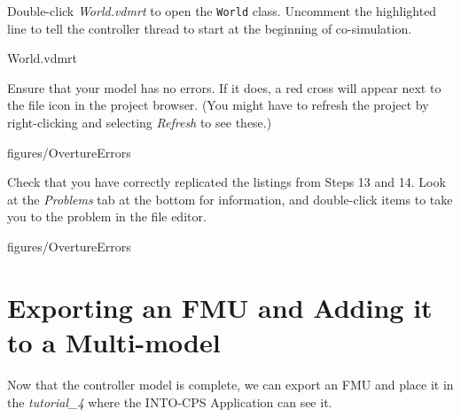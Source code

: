 \documentclass[11pt,a4paper]{../tutorial}
\begin{document}
\begin{instructions}
\item \label{step:world} Double-click \emph{World.vdmrt} to open the \texttt{World} class. Uncomment the highlighted line to tell the controller thread to start at the beginning of co-simulation.

    \bigskip
    
    {World.vdmrt}

\item Ensure that your model has no errors. If it does, a red cross will appear next to the file icon in the project browser. (You might have to refresh the project by right-clicking and selecting \emph{Refresh} to see these.)

    \begin{annotation}[width=0.25\linewidth,trim=0 340 535 60,clip]{figures/OvertureErrors}
    \end{annotation}

    Check that you have correctly replicated the listings from Steps 13 and 14. Look at the \emph{Problems} tab at the bottom for information, and double-click items to take you to the problem in the file editor.

    \begin{annotation}[width=0.99\linewidth,trim=0 0 0 400,clip]{figures/OvertureErrors}
    \end{annotation}

\end{instructions}

\section{Exporting an FMU and Adding it to a Multi-model}

Now that the controller model is complete, we can export an FMU and place it in the \emph{tutorial\_4} where the INTO-CPS Application can see it.
\end{document}

